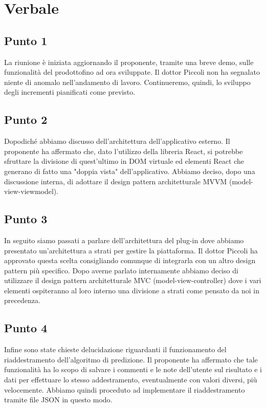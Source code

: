 \section{Verbale}
        \subsection{Punto 1}
            La riunione è iniziata aggiornando il proponente, tramite una breve demo, sulle funzionalità del prodotto\glosp fino ad ora sviluppate. Il dottor Piccoli non ha segnalato niente di anomalo nell'andamento di lavoro. Continueremo, quindi, lo sviluppo degli incrementi pianificati come previsto.
        \subsection{Punto 2}
            Dopodiché abbiamo discusso dell'architettura dell'applicativo esterno. Il proponente ha affermato che, dato l'utilizzo della libreria React, si potrebbe sfruttare la divisione di quest'ultimo in DOM virtuale ed elementi React che generano di fatto una "doppia vista" dell'applicativo. Abbiamo deciso, dopo una discussione interna, di adottare il design pattern architetturale MVVM (model-view-viewmodel).
        \subsection{Punto 3}
            In seguito siamo passati a parlare dell'architettura del plug-in dove abbiamo presentato un'architettura a strati per gestire la piattaforma. Il dottor Piccoli ha approvato questa scelta consigliando comunque di integrarla con un altro design pattern più specifico. Dopo averne parlato internamente abbiamo deciso di utilizzare il design pattern architetturale MVC (model-view-controller) dove i vari elementi ospiteranno al loro interno una divisione a strati come pensato da noi in precedenza.
        \subsection{Punto 4}
            Infine sono state chieste delucidazione riguardanti il funzionamento del riaddestramento dell'algoritmo di predizione. Il proponente ha affermato che tale funzionalità ha lo scopo di salvare i commenti e le note dell'utente sul risultato e i dati per effettuare lo stesso addestramento, eventualmente con valori diversi, più velocemente. Abbiamo quindi proceduto ad implementare il riaddestramento tramite file JSON in questo modo.